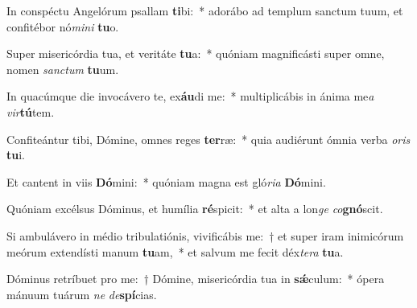 \item In conspéctu Angelórum psallam \textbf{ti}bi:~* adorábo ad templum sanctum tuum, et confitébor nó\textit{mi}\textit{ni} \textbf{tu}o.
\item Super misericórdia tua, et veritáte \textbf{tu}a:~* quóniam magnificásti super omne, nomen \textit{sanc}\textit{tum} \textbf{tu}um.
\item In quacúmque die invocávero te, ex\textbf{áu}di me:~* multiplicábis in ánima me\textit{a} \textit{vir}\textbf{tú}tem.
\item Confiteántur tibi, Dómine, omnes reges \textbf{ter}ræ:~* quia audiérunt ómnia verba \textit{o}\textit{ris} \textbf{tu}i.
\item Et cantent in viis \textbf{Dó}mini:~* quóniam magna est gló\textit{ri}\textit{a} \textbf{Dó}mini.
\item Quóniam excélsus Dóminus, et humília \textbf{ré}spicit:~* et alta a lon\textit{ge} \textit{co}\textbf{gnó}scit.
\item Si ambulávero in médio tribulatiónis, vivificábis me:~† et super iram inimicórum meórum extendísti manum \textbf{tu}am,~* et salvum me fecit déx\textit{te}\textit{ra} \textbf{tu}a.
\item Dóminus retríbuet pro me:~† Dómine, misericórdia tua in \textbf{sǽ}culum:~* ópera mánuum tuárum \textit{ne} \textit{de}\textbf{spí}cias.
